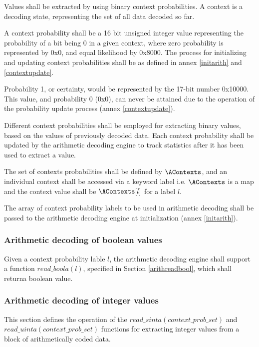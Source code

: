 Values shall be extracted by using binary context probabilities. A context is a 
decoding state, representing the set of all data decoded so far.

A context probability shall be a 16 bit unsigned integer value representing the 
probability of a bit being 0 in a given context, where zero probability is 
represented by 0x0, and equal likelihood by 0x8000. The process for initializing
 and updating context probabilities shall be as defined in annex 
\ref{initarith} and \ref{contextupdate}.

\begin{informative}
Probability 1, or certainty, would be represented by the 17-bit number 0x10000. 
This value, and probability 0 (0x0), can never be attained due to the operation 
of the probability update process (annex \ref{contextupdate}).
\end{informative}

Different context probabilities shall be employed for extracting binary values, 
based on the values of previously decoded data. Each context probability shall 
be updated by the arithmetic decoding engine to track statistics after it
has been used to extract a value.

The set of contexts probabilities shall be defined by $\AContexts$, and an 
individual context shall be accessed via a keyword label i.e. 
$\AContexts$ is a map and the context value shall be $\AContexts[l]$ for a 
label $l$.

The array of context probability labels to be used in arithmetic decoding shall 
be passed to the arithmetic decoding engine at initialization (annex 
\ref{initarith}).

\subsubsection{Arithmetic decoding of boolean values}

Given a context probability lable $l$, the arithmetic decoding engine shall support a function
$read\_boola(l)$, specified in Section \ref{arithreadbool}, which shall returna boolean value.

\subsubsection{Arithmetic decoding of integer values}

\label{arithreadint}

This section defines the operation of the $read\_sinta(context\_prob\_set)$ and
$read\_uinta(context\_prob\_set)$ functions
 for extracting integer values from a block of arithmetically coded data.

